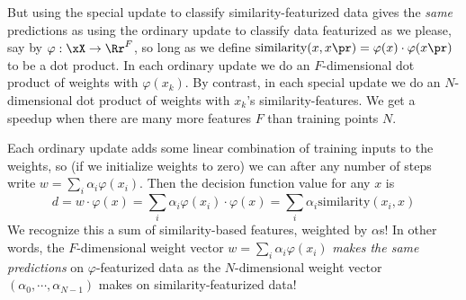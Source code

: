   But using the special update to classify similarity-featurized data gives the
  \emph{same}
  predictions as using the ordinary update to classify data
  featurized as we please, say by $\varphi:\xX \to \Rr^F$, so long as
  we define
  $
    \text{similarity}(x,x\pr)=\varphi(x)\cdot\varphi(x\pr)
  $
  to be a dot product.
  In each ordinary update we do an $F$-dimensional dot product of weights with
  $\varphi(x_k)$.  By contrast, in each special update we do an $N$-dimensional
  dot product of weights with $x_k$'s similarity-features.  We get a speedup
  when there are many more features $F$ than training points $N$.

  \newpage
  Each ordinary update adds some linear combination of training inputs to the
  weights, so (if we initialize weights to zero) we can after any number of
  steps write
  $w = \sum_i \alpha_i \varphi(x_i)$.
  Then the decision function value for any $x$ is
  $$
    d = w \cdot \varphi(x)
      = \sum_i \alpha_i \varphi(x_i)\cdot\varphi(x)
      = \sum_i \alpha_i \text{similarity}(x_i, x)
  $$
  We recognize this a sum of similarity-based features, weighted by $\alpha$s!
  In other words, the $F$-dimensional weight vector $w=\sum_i \alpha_i
  \varphi(x_i)$ \emph{makes the same predictions} on $\varphi$-featurized data
  as the $N$-dimensional weight vector $(\alpha_0, \cdots, \alpha_{N-1})$ makes
  on similarity-featurized data!

